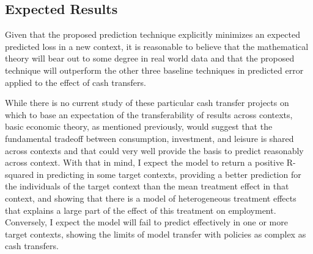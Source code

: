 \documentclass[a4paper,12pt]{article}
\begin{document}
\subsection{ Expected Results }

Given that the proposed prediction technique explicitly minimizes an expected predicted loss in a new context, it is reasonable to believe that the mathematical theory will bear out to some degree in real world data and that the proposed technique will outperform the other three baseline techniques in predicted error applied to the effect of cash transfers.

While there is no current study of these particular cash transfer projects on which to base an expectation of the transferability of results across contexts, basic economic theory, as mentioned previously, would suggest that the fundamental tradeoff between consumption, investment, and leisure is shared across contexts and that could very well provide the basis to predict reasonably across context. With that in mind, I expect the model to return a positive R-squared in predicting in some target contexts, providing a better prediction for the individuals of the target context than the mean treatment effect in that context, and showing that there is a model of heterogeneous treatment effects that explains a large part of the effect of this treatment on employment. Conversely, I expect the model will fail to predict effectively in one or more target contexts, showing the limits of model transfer with policies as complex as cash transfers.









\end{document}
